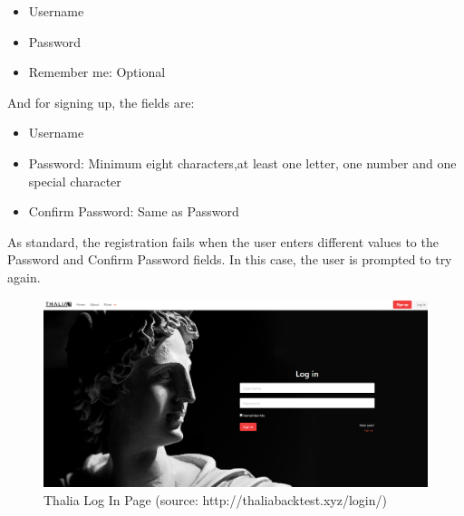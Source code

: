 \documentclass[main.tex]{subfiles}
\begin{document}
\begin{itemize}

    \item Username

    \item Password

    \item Remember me: Optional

\end{itemize}



And for signing up, the fields are:



\begin{itemize}

    \item Username

    \item Password: Minimum eight characters,at least one letter, one number and one special character

    \item Confirm Password: Same as Password

\end{itemize}



As standard, the registration fails when the user enters different values to the Password and Confirm Password fields. In this case, the user is prompted to try again.



\begin{figure}[H]

   \centering

   \includegraphics[width=\textwidth]{08Appendices/081User/081Pictures/login.png}

   \caption{Thalia Log In Page (source: http://thaliabacktest.xyz/login/)}

   \label{thalia_login}

\end{figure}
\end{document}
